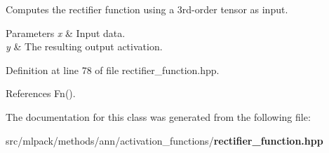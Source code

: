 Computes the rectifier function using a 3rd-\/order tensor as input. 


\begin{DoxyParams}{Parameters}
{\em x} & Input data. \\
\hline
{\em y} & The resulting output activation. \\
\hline
\end{DoxyParams}


Definition at line 78 of file rectifier\+\_\+function.\+hpp.



References Fn().



The documentation for this class was generated from the following file\+:\begin{DoxyCompactItemize}
\item 
src/mlpack/methods/ann/activation\+\_\+functions/{\bf rectifier\+\_\+function.\+hpp}\end{DoxyCompactItemize}
